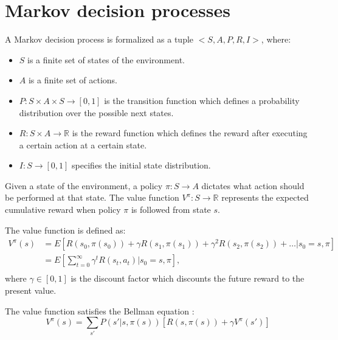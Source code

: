 
\section{Markov decision processes}
\label{se:MDP}

\begin{definition} A Markov decision process is formalized as a tuple $<S, A, P, R, I>$, where:
\begin{itemize}
    \item $S$ is a finite set of states of the environment.
    \item $A$ is a finite set of actions.
    \item $P:S \times A \times S \rightarrow [0, 1]$ is the transition function which defines a probability distribution over the possible next states.
    \item $R:S \times A \rightarrow \mathbb{R}$ is the reward function which defines the reward after executing a certain action at a certain state.
    \item $I:S \rightarrow [0, 1]$ specifies the initial state distribution.
 \end{itemize}
\end{definition}

Given a state of the environment, a policy $\pi: S \rightarrow A$ dictates what action should be performed at that state. 
The value function $V^{\pi}: S \rightarrow \mathbb{R}$ represents the expected cumulative reward when 
policy $\pi$ is followed from state $s$.

The value function is defined as:
\begin{align}
    V^{\pi}(s) &= E[R(s_0, \pi(s_0)) + \gamma R(s_1, \pi(s_1)) + \gamma^2 R(s_2, \pi(s_2)) + \dots | s_0 = s, \pi]\\
               &= E[\sum_{t=0}^{\infty}\gamma^t R(s_t, a_t) | s_0=s, \pi],\\
    \label{eq:defV}
\end{align}
where $\gamma \in [0, 1]$ is the discount factor which discounts the future reward to the present value.

The value function satisfies the Bellman equation \cite{Bellman57}:
\begin{equation}
    V^{\pi}(s) = \sum_{s'}P(s'|s, \pi(s))[R(s, \pi(s)) + \gamma V^{\pi}(s')]
    \label{eq:V}
\end{equation}

